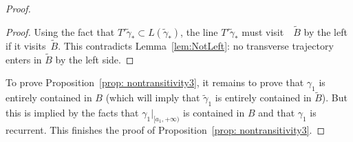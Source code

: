 \begin{proof}
\begin{proof}
Using the fact that $T'\tilde\gamma_*\subset L(\tilde\gamma_*)$, the line $T'\tilde\gamma_*$ must visit~~$\tilde B$ by the left if it visits~$\tilde B$. This contradicts Lemma~\ref{lem:NotLeft}: no transverse trajectory enters in $\tilde B$ by the left side.
\end{proof}

To prove Proposition~\ref{prop: nontransitivity3}, it remains to prove that $\gamma_1$ is entirely contained in $B$ (which will imply that $\tilde\gamma_1$ is entirely contained in $\tilde B$). But this is implied by the facts that $\gamma_1\vert_{[a_1,+\infty)}$ is contained in $B$ and that $\gamma_1$ is recurrent. This finishes the proof of Proposition~\ref{prop: nontransitivity3}.
\end{proof}

